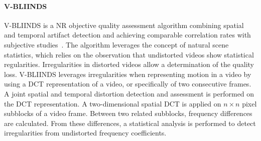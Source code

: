 \paragraph{V-BLIINDS}
\ac{V-BLIINDS} is a \ac{NR} objective quality assessment algorithm combining spatial and temporal artifact detection and achieving comparable correlation rates with subjective studies~\cite{Saad2014}. 
The algorithm leverages the concept of natural scene statistics, which relies on the observation that undistorted videos show statistical regularities.
Irregularities in distorted videos allow a determination of the quality loss.
\ac{V-BLIINDS} leverages irregularities when representing motion in a video by using a \ac{DCT} representation of a video, or specifically of two consecutive frames. 
A joint spatial and temporal distortion detection and assessment is performed on the \ac{DCT} representation.
A two-dimensional spatial \ac{DCT} is applied on $n \times n$ pixel subblocks of a video frame.
Between two related subblocks, frequency differences are calculated.
From these differences, a statistical analysis is performed to detect irregularities from undistorted frequency coefficients.

